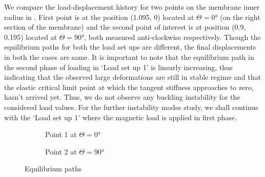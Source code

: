 \documentclass[11pt,a4paper,final]{article}
\begin{document}
We compare the load-displacement history for two points on the membrane inner radius in . First point is at the position (1.095, 0) located at $\Theta = \ang{0}$ (on the right section of the membrane) and the second point of interest is at position (0.9, 0.195) located at $\Theta = \ang{90}$, both measured anti-clockwise respectively. Though the equilibrium paths for both the load set ups are different, the final displacements in both the cases are same. It is important to note that the equilibrium path in the second phase of loading in `Load set up 1' is linearly increasing, thus indicating that the observed large deformations are still in stable regime and that the elastic critical limit point at which the tangent stiffness approaches to zero, hasn't arrived yet. Thus, we do not observe any buckling instability for the considered load values. For the further instability modes study, we shall continue with the `Load set up 1' where the magnetic load is applied in first phase. \par  

\begin{figure}[h]
\begin{subfigure}[t]{0.49\linewidth}
\centering
{}
\caption{Point 1 at $\Theta = \ang{0}$}
\label{fig:3.15.1}
\end{subfigure}
\begin{subfigure}[t]{0.49\linewidth}
\centering
{}
\caption{Point 2 at $\Theta = \ang{90}$}
\label{fig:3.15.2}
\end{subfigure}
\caption{Equilibrium paths}
\label{fig:3.15}
\end{figure}
\end{document}
